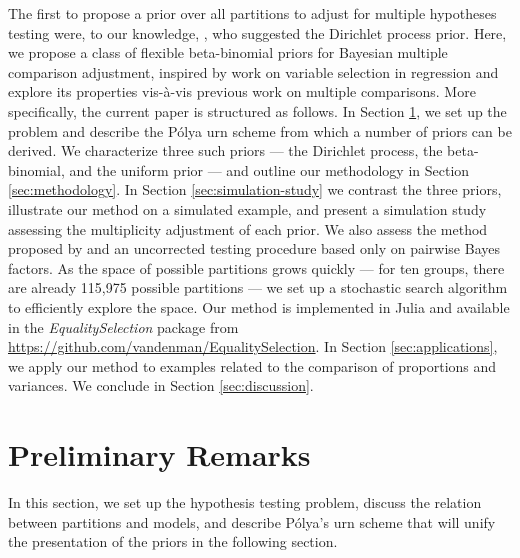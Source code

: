 \documentclass[11pt,a4paper]{article}
\theoremstyle{definition} %
\theoremstyle{case}
\begin{document}
The first to propose a prior over all partitions to adjust for multiple hypotheses testing were, to our knowledge, \textcite{gopalan1998bayesian}, who suggested the Dirichlet process prior. Here, we propose a class of flexible beta-binomial priors for Bayesian multiple comparison adjustment, inspired by work on variable selection in regression \parencite{scott2006exploration, scott2010bayes} and explore its properties vis-à-vis previous work on multiple comparisons. More specifically, the current paper is structured as follows. In Section \ref{sec:setup}, we set up the problem and describe the P\'{o}lya urn scheme from which a number of priors can be derived. We characterize three such priors --- the Dirichlet process, the beta-binomial, and the uniform prior --- and outline our methodology in Section \ref{sec:methodology}. In Section \ref{sec:simulation-study} we contrast the three priors, illustrate our method on a simulated example, and present a simulation study assessing the multiplicity adjustment of each prior. We also assess the method proposed by \textcite{westfall1997bayesian} and an uncorrected testing procedure based only on pairwise Bayes factors. As the space of possible partitions grows quickly --- for ten groups, there are already 115,975 possible partitions --- we set up a stochastic search algorithm to efficiently explore the space. Our method is implemented in Julia and available in the \textit{EqualitySelection} package from \url{https://github.com/vandenman/EqualitySelection}. In Section \ref{sec:applications}, we apply our method to examples related to the comparison of proportions and variances. We conclude in Section \ref{sec:discussion}.




\section{Preliminary Remarks} \label{sec:setup}
In this section, we set up the hypothesis testing problem, discuss the relation between partitions and models, and describe P\'{o}lya's urn scheme that will unify the presentation of the priors in the following section. 
\end{document}
